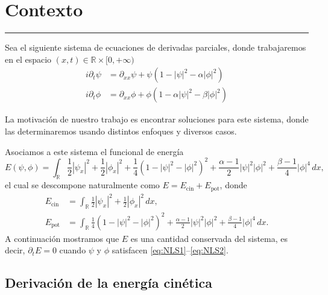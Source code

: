 \documentclass[letterpaper,11pt]{exam}
\newcommand{\R}{\mathbb R}
\theoremstyle{plain}
\begin{document}
\section*{Contexto}
\vspace{-5mm}
\noindent\rule{\columnwidth}{0.4pt}
Sea el siguiente sistema de ecuaciones de derivadas parciales, donde trabajaremos en el espacio $(x,t)\in \R \times [0, +\infty)$
\begin{align}
    i \partial_t \psi&=\partial_{xx}\psi + \psi (1-|\psi|^2-\alpha|\phi|^2) \label{eq:NLS1} \\
     i \partial_t \phi&=\partial_{xx}\phi + \phi(1-\alpha|\psi|^2-\beta|\phi|^2) \label{eq:NLS2}
\end{align}

La motivación de nuestro trabajo es encontrar soluciones para este sistema, donde las determinaremos usando distintos enfoques y diversos casos.

Asociamos a este sistema el funcional de energía
\begin{equation}\label{eq:energia}
    E(\psi,\phi) = \int_{\mathbb{R}} \frac{1}{2}|\psi_x|^2 + \frac{1}{2}|\phi_x|^2
    + \frac{1}{4}(1 - |\psi|^2 - |\phi|^2)^2
    + \frac{\alpha - 1}{2}|\psi|^2|\phi|^2
    + \frac{\beta - 1}{4}|\phi|^4 \, dx,
\end{equation}
el cual se descompone naturalmente como $E = E_{\mathrm{cin}} + E_{\mathrm{pot}}$, donde
\begin{align}
    E_{\mathrm{cin}} &= \int_{\mathbb{R}} \frac{1}{2}|\psi_x|^2 + \frac{1}{2}|\phi_x|^2 \, dx, \\
    E_{\mathrm{pot}} &= \int_{\mathbb{R}} \frac{1}{4}(1 - |\psi|^2 - |\phi|^2)^2
    + \frac{\alpha-1}{2}|\psi|^2|\phi|^2 + \frac{\beta-1}{4}|\phi|^4 \, dx.
\end{align}
A continuación mostramos que $E$ es una cantidad conservada del sistema, es decir, $\partial_t E = 0$ cuando
$\psi$ y $\phi$ satisfacen \eqref{eq:NLS1}--\eqref{eq:NLS2}.

\subsection*{Derivación de la energía cinética}
\end{document}
